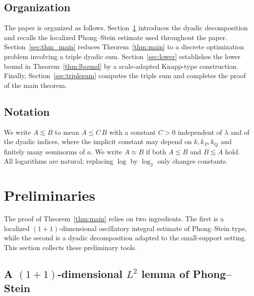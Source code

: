 \documentclass[10pt]{amsart}
\numberwithin{equation}{section}
\theoremstyle{definition}
\theoremstyle{remark}
\theoremstyle{remark}
\begin{document}
	
	\subsection*{Organization}
	The paper is organized as follows.
    Section~\ref{sec:pre} introduces the dyadic decomposition and recalls the localized Phong--Stein estimate used throughout the paper. Section~\ref{sec:thm_main} reduces Theorem~\ref{thm:main} to a discrete optimization problem involving a triple dyadic sum.
    Section~\ref{sec:lower} establishes the lower bound in Theorem~\ref{thm:lbound} by a scale-adapted Knapp-type construction.
    Finally, Section~\ref{sec:triplesum} computes the triple sum and completes the proof of the main
    theorem.

	
	\subsection*{Notation}\label{subsec:conv}
	
	We write \(A\lesssim B\) to mean \(A\le C\,B\) with a constant \(C>0\) independent of \(\lambda\)
	and of the dyadic indices, where the implicit constant may depend on \(k,k_P,k_Q\) and finitely many seminorms of \(a\).
	We write \(A\approx B\) if both \(A\lesssim B\) and \(B\lesssim A\) hold.
	All logarithms are natural; replacing \(\log\) by \(\log_2\) only changes constants.
	
	
	
	
	
	
	
	
	
	
	
	
	
	
	
	
	
	\section{Preliminaries}\label{sec:pre}
	
	The proof of Theorem~\ref{thm:main} relies on two ingredients.
    The first is a localized $(1+1)$-dimensional oscillatory integral estimate of Phong--Stein type, while the second is a dyadic decomposition adapted to the small-support setting.
    This section collects these preliminary tools.
	
	\subsection{A $(1+1)$-dimensional $L^2$ lemma of Phong--Stein}\label{subsec:PS}
	
\end{document}
